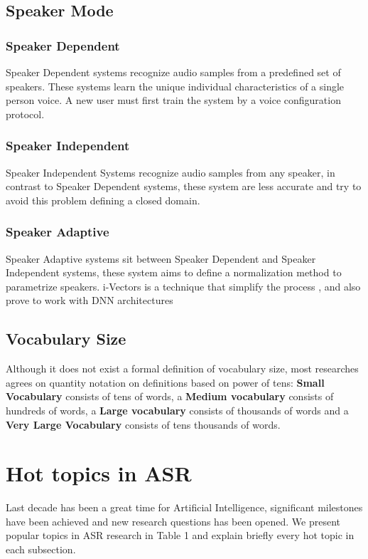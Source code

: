\subsection{Speaker Mode}
\subsubsection{Speaker Dependent}
Speaker Dependent systems recognize audio samples from a predefined set of speakers.
These systems learn the unique individual characteristics of a single person voice. A new user must first train the system by a voice configuration protocol.
\subsubsection{Speaker Independent}
Speaker Independent Systems recognize audio samples from any speaker, in contrast to Speaker Dependent systems, these system are less accurate and try to avoid this problem defining a closed domain.
\subsubsection{Speaker Adaptive}
Speaker Adaptive systems sit between Speaker Dependent and Speaker Independent systems, these system aims to define a normalization method to parametrize speakers. i-Vectors is a technique that simplify the process \cite{Xiong2017}, and also prove to work with DNN architectures  \cite{MiaoIEEE/ACMI-vectors}
\subsection{Vocabulary Size}
Although it does not exist a formal definition of vocabulary size, most researches agrees on quantity notation on definitions based on power of tens: \textbf{Small Vocabulary} consists of tens of words, a \textbf{Medium vocabulary} consists of hundreds of words, a \textbf{Large vocabulary} consists of thousands of words and a \textbf{Very Large Vocabulary} consists of tens thousands of words.
\section{Hot topics in ASR}

Last decade has been a great time for Artificial Intelligence, significant milestones have been achieved and new research questions has been opened. We present popular topics in ASR research in Table 1 and explain briefly every hot topic in each subsection.

